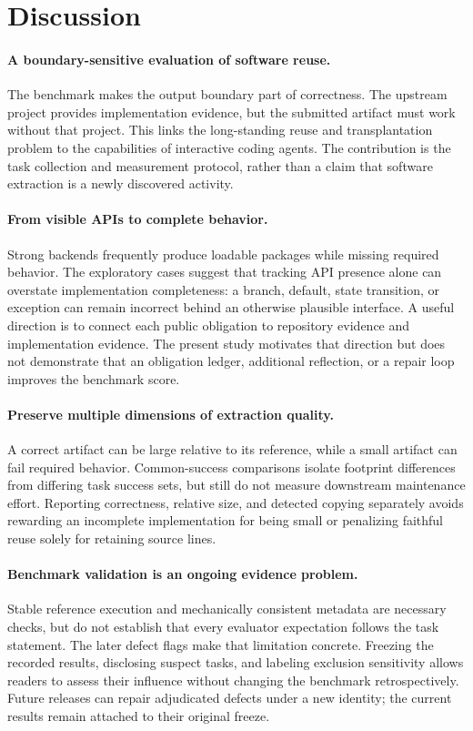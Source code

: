 \documentclass[acmsmall,screen,review,anonymous]{acmart}
\begin{document}
\section{Discussion}
\label{sec:discussion}

\paragraph{A boundary-sensitive evaluation of software reuse.}
The benchmark makes the output boundary part of correctness. The upstream
project provides implementation evidence, but the submitted artifact must work
without that project. This links the long-standing reuse and transplantation
problem to the capabilities of interactive coding agents. The contribution is
the task collection and measurement protocol, rather than a claim that software
extraction is a newly discovered activity.

\paragraph{From visible APIs to complete behavior.}
Strong backends frequently produce loadable packages while missing required
behavior. The exploratory cases suggest that tracking API presence alone can
overstate implementation completeness: a branch, default, state transition, or
exception can remain incorrect behind an otherwise plausible interface. A useful
direction is to connect each public obligation to repository evidence and
implementation evidence. The present study motivates that direction but does
not demonstrate that an obligation ledger, additional reflection, or a repair
loop improves the benchmark score.

\paragraph{Preserve multiple dimensions of extraction quality.}
A correct artifact can be large relative to its reference, while a small
artifact can fail required behavior. Common-success comparisons isolate
footprint differences from differing task success sets, but still do not
measure downstream maintenance effort. Reporting correctness, relative size,
and detected copying separately avoids rewarding an incomplete implementation
for being small or penalizing faithful reuse solely for retaining source lines.

\paragraph{Benchmark validation is an ongoing evidence problem.}
Stable reference execution and mechanically consistent metadata are necessary
checks, but do not establish that every evaluator expectation follows the task
statement. The later defect flags make that limitation concrete. Freezing the
recorded results, disclosing suspect tasks, and labeling exclusion sensitivity
allows readers to assess their influence without changing the benchmark
retrospectively. Future releases can repair adjudicated defects under a new
identity; the current results remain attached to their original freeze.
\end{document}
